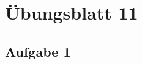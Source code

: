 \documentclass[aspectratio=169,usepdftitle=true,11pt,ngerman,t]{beamer}
\subtitle{Tutorium 12}
\date{17. Januar 2025}
\begin{document}
\section[Übungsblatt 11]{Übungsblatt 11}

\subsection{Aufgabe 1}
% 
\end{document}
